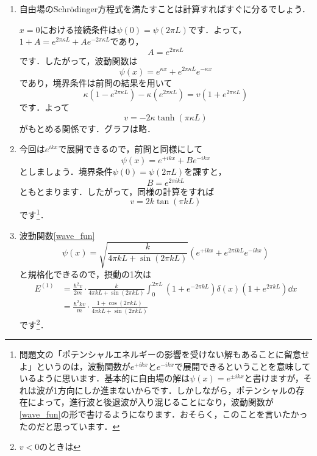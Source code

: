 \documentclass[a4paper,pdflatex,ja=standard]{bxjsarticle}
\begin{document}
\begin{enumerate}
  
  \item 

  自由場のSchrödinger方程式を満たすことは計算すればすぐに分るでしょう．

  $x=0$における接続条件は$\psi(0)=\psi(2\pi L)$です．よって，$1+A=e^{2\pi\kappa L}+Ae^{-2\pi\kappa L}$であり，
  \begin{equation}
    A
    =
    e^{2\pi\kappa L}
  \end{equation}
  です．したがって，波動関数は
  \begin{equation}
    \psi(x)
    =
    e^{\kappa x}
    +
    e^{2\pi\kappa L}e^{-\kappa x}
  \end{equation}
  であり，境界条件は前問の結果を用いて
  \begin{equation}
    \kappa
    (1-e^{2\pi\kappa L})
    -
    \kappa
    (e^{2\pi\kappa L})
    =
    v(1+e^{2\pi\kappa L})
  \end{equation}
  です．よって
  \begin{equation}
    v
    =
    -2\kappa\tanh(\pi\kappa L)
  \end{equation}
  がもとめる関係です．グラフは略．


  \item 

  今回は$e^{ikx}$で展開できるので，前問と同様にして
  \begin{equation}
    \psi(x)
    =
    e^{+ikx}+Be^{-ikx}
    \label{wave_fun}
  \end{equation}
  としましょう．境界条件$\psi(0)=\psi(2\pi L)$を課すと，
  \begin{equation}
    B
    =
    e^{2\pi ikL}
  \end{equation}
  ともとまります．したがって，同様の計算をすれば
  \begin{equation}
    v
    =
    2k\tan(\pi kL)
  \end{equation}
  です\footnote{
    問題文の「ポテンシャルエネルギーの影響を受けない解もあることに留意せよ」というのは，波動関数が$e^{+ikx}$と$e^{-ikx}$で展開できるということを意味しているように思います．基本的に自由場の解は$\psi(x)=e^{\pm ikx}$と書けますが，それは波が1方向にしか進まないからです．しかしながら，ポテンシャルの存在によって，進行波と後退波が入り混じることになり，波動関数が\eqref{wave_fun}の形で書けるようになります．おそらく，このことを言いたかったのだと思っています．
  }．


  \item 

  波動関数\eqref{wave_fun}
  \begin{equation}
    \psi(x)
    =
    \sqrt{\frac{k}{4\pi kL+\sin(2\pi kL)}}
    (e^{+ikx}+e^{2\pi ikL}e^{-ikx})
  \end{equation}
  と規格化できるので，摂動の1次は
  \begin{align}
    E^{(1)}
    &=
    \frac{\hbar^2 v}{2m}
    \cdot
    \frac{k}{4\pi kL+\sin(2\pi kL)}
    \int_{0}^{2\pi L}
    (1+e^{-2\pi kL})\delta(x)(1+e^{2\pi kL})
    \dd x
    \nonumber
    \\
    &=
    \frac{\hbar^2 kv}{m}
    \cdot
    \frac{1+\cos(2\pi kL)}{4\pi kL+\sin(2\pi kL)}
  \end{align}
  です\footnote{
    $v<0$のときは
  }．


\end{enumerate}
\end{document}

